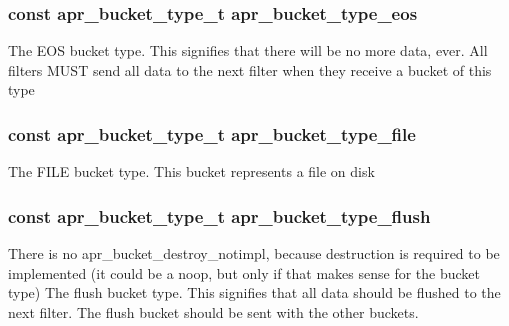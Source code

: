 \subsubsection[{\texorpdfstring{apr\+\_\+bucket\+\_\+type\+\_\+eos}{apr_bucket_type_eos}}]{ const {\bf apr\+\_\+bucket\+\_\+type\+\_\+t} apr\+\_\+bucket\+\_\+type\+\_\+eos}\hypertarget{group__APR__Util__Bucket__Brigades_ga21b10f799879619e86369add3dd2848b}{}\label{group__APR__Util__Bucket__Brigades_ga21b10f799879619e86369add3dd2848b}
The E\+OS bucket type. This signifies that there will be no more data, ever. All filters M\+U\+ST send all data to the next filter when they receive a bucket of this type 
\subsubsection[{\texorpdfstring{apr\+\_\+bucket\+\_\+type\+\_\+file}{apr_bucket_type_file}}]{ const {\bf apr\+\_\+bucket\+\_\+type\+\_\+t} apr\+\_\+bucket\+\_\+type\+\_\+file}\hypertarget{group__APR__Util__Bucket__Brigades_gaaeb5cd89cf6ba890f329bbd656d2824d}{}\label{group__APR__Util__Bucket__Brigades_gaaeb5cd89cf6ba890f329bbd656d2824d}
The F\+I\+LE bucket type. This bucket represents a file on disk 
\subsubsection[{\texorpdfstring{apr\+\_\+bucket\+\_\+type\+\_\+flush}{apr_bucket_type_flush}}]{ const {\bf apr\+\_\+bucket\+\_\+type\+\_\+t} apr\+\_\+bucket\+\_\+type\+\_\+flush}\hypertarget{group__APR__Util__Bucket__Brigades_ga5e315ec48f1dc4b06877fc63518248c9}{}\label{group__APR__Util__Bucket__Brigades_ga5e315ec48f1dc4b06877fc63518248c9}
There is no apr\+\_\+bucket\+\_\+destroy\+\_\+notimpl, because destruction is required to be implemented (it could be a noop, but only if that makes sense for the bucket type) The flush bucket type. This signifies that all data should be flushed to the next filter. The flush bucket should be sent with the other buckets. 
